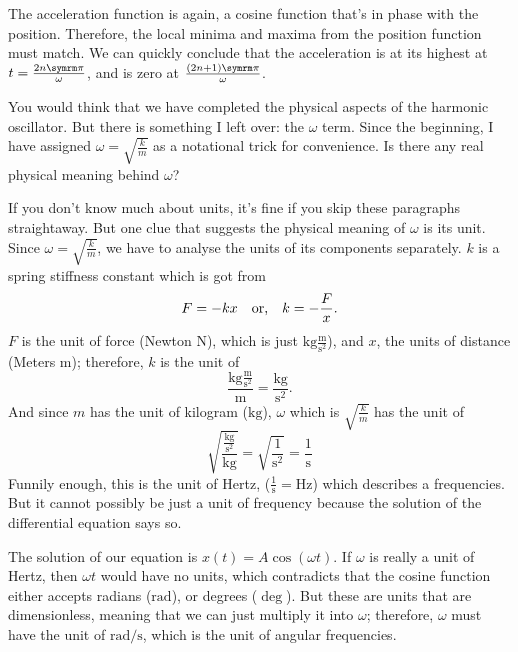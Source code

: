 The acceleration function is again, a cosine function that's in phase with the position. Therefore, the local minima and maxima from the position function must match. We can quickly conclude that the acceleration is at its highest at $t = \frac{2n\cpi}{\omega}$, and is zero at $\frac{(2n + 1)\cpi}{\omega}$.

You would think that we have completed the physical aspects of the harmonic oscillator. But there is something I left over: the $\omega$ term. Since the beginning, I have assigned $\omega = \sqrt{\frac{k}{m}}$ as a notational trick for convenience. Is there any real physical meaning behind $\omega$?

If you don't know much about units, it's fine if you skip these paragraphs straightaway. But one clue that suggests the physical meaning of $\omega$ is its unit. Since $\omega = \sqrt{\frac{k}{m}}$, we have to analyse the units of its components separately. $k$ is a spring stiffness constant which is got from
\begin{equation}
	F = -kx \quad\textrm{or,}\quad k = -\frac{F}{x}.
\end{equation}
$F$ is the unit of force (Newton $\unit{\newton}$), which is just $\unit{\kilogram}\frac{\unit{\meter}}{\unit{\second^2}}$), and $x$, the units of distance (Meters $\unit{\meter}$); therefore, $k$ is the unit of
\begin{equation}
	\frac{\unit{\kilogram}\frac{\unit{\meter}}{\unit{\second^2}}}{\unit{\meter}} = \frac{\unit{\kilogram}}{\unit{\second^2}}.
\end{equation}
And since $m$ has the unit of kilogram ($\unit{\kilogram}$), $\omega$ which is $\sqrt{\frac{k}{m}}$ has the unit of
\begin{equation}
	\sqrt{\frac{\frac{\unit{\kilogram}}{\unit{\second^2}}}{\unit{\kilogram}}} = \sqrt{\frac{1}{\unit{\second^2}}} = \frac{1}{\unit{\second}}
\end{equation}
Funnily enough, this is the unit of Hertz, ($\frac{1}{\unit{\second}} = \unit{\hertz}$) which describes a frequencies. But it cannot possibly be just a unit of frequency because the solution of the differential equation says so.

The solution of our equation is $x(t) = A\cos(\omega t)$. If $\omega$ is really a unit of Hertz, then $\omega t$ would have no units, which contradicts that the cosine function either accepts radians ($\unit{\radian}$), or degrees ($\unit{\deg}$). But these are units that are dimensionless, meaning that we can just multiply it into $\omega$; therefore, $\omega$ must have the unit of $\unit{\radian\per\second}$, which is the unit of angular frequencies.


